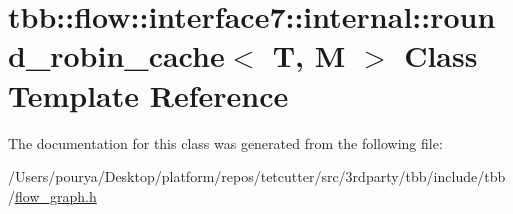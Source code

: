 \hypertarget{classtbb_1_1flow_1_1interface7_1_1internal_1_1round__robin__cache}{}\section{tbb\+:\+:flow\+:\+:interface7\+:\+:internal\+:\+:round\+\_\+robin\+\_\+cache$<$ T, M $>$ Class Template Reference}
\label{classtbb_1_1flow_1_1interface7_1_1internal_1_1round__robin__cache}


The documentation for this class was generated from the following file\+:\begin{DoxyCompactItemize}
\item 
/\+Users/pourya/\+Desktop/platform/repos/tetcutter/src/3rdparty/tbb/include/tbb/\hyperlink{flow__graph_8h}{flow\+\_\+graph.\+h}\end{DoxyCompactItemize}
